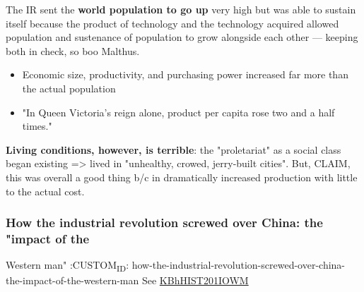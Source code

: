 \documentclass[letterpaper]{article}
\begin{document}
The IR sent the \textbf{world population to go up} very high but was able to
sustain itself because the product of technology and the technology
acquired allowed population and sustenance of population to grow
alongside each other --- keeping both in check, so boo Malthus.

\begin{itemize}
\item Economic size, productivity, and purchasing power increased far more
than the actual population
\item "In Queen Victoria's reign alone, product per capita rose two and a
half times."
\end{itemize}

\textbf{Living conditions, however, is terrible}: the "proletariat" as a social
class began existing => lived in "unhealthy, crowed, jerry-built
cities". But, CLAIM, this was overall a good thing b/c in dramatically
increased production with little to the actual cost.

\subsubsection{How the industrial revolution screwed over China: the "impact of the}
\label{sec:orgd66a270}
Western man"
:CUSTOM\textsubscript{ID}: how-the-industrial-revolution-screwed-over-china-the-impact-of-the-western-man
See \href{KBhHIST201IOWM.org}{KBhHIST201IOWM}
\end{document}
